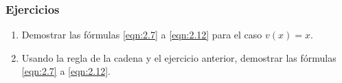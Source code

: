 \subsubsection{Ejercicios}
\begin{enumerate}
\item Demostrar las fórmulas \ref{eqn:2.7} a \ref{eqn:2.12} para el caso $v(x)=x$.
\item Usando la regla de la cadena y el ejercicio anterior, demostrar las fórmulas \ref{eqn:2.7} a \ref{eqn:2.12}.
\end{enumerate}